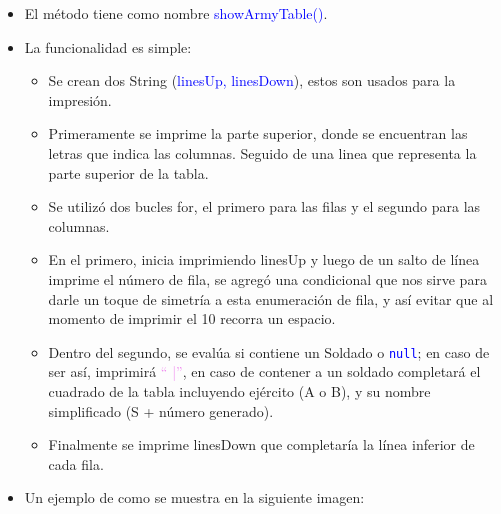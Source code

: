 \documentclass{article}
\begin{document}
        \begin{itemize}
            \item El método tiene como nombre \textcolor{blue}{showArmyTable()}.
            \item La funcionalidad es simple:
            \begin{itemize}
                \item Se crean dos String (\textcolor{blue}{linesUp, linesDown}), estos son usados para la impresión.
                \item Primeramente se imprime la parte superior, donde se encuentran las letras que indica las columnas. Seguido de una linea que representa la parte superior de la tabla.
                \item Se utilizó dos bucles for, el primero para las filas y el segundo para las columnas.
                \item En el primero, inicia imprimiendo linesUp y luego de un salto de línea imprime el número de fila, se agregó una condicional que nos sirve para darle un toque de simetría a esta enumeración de fila, y así evitar que al momento de imprimir el 10 recorra un espacio.
                \item Dentro del segundo, se evalúa si contiene un Soldado o \textcolor{blue}{\texttt{null}}; en caso de ser así, imprimirá \textcolor{violet}{`` |''}, en caso de contener a un soldado completará el cuadrado de la tabla incluyendo ejército (A o B), y su nombre simplificado (S + número generado).
                \item Finalmente se imprime linesDown que completaría la línea inferior de cada fila.
            \end{itemize}
        \end{itemize}

        

        \begin{itemize}
            \begin{itemize}
                \item Un ejemplo de como se muestra en la siguiente imagen:
            \end{itemize}
        \end{itemize}
\end{document}
